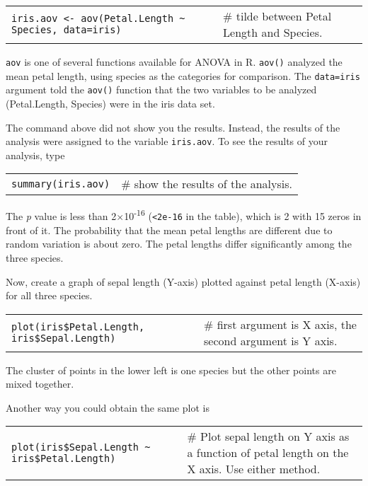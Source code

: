 \documentclass[11pt]{article}
\begin{document}
\begin{tabular}{@{}L{4in}L{1.5in}@{}}
\texttt{iris.aov \textless{}- aov(Petal.Length \textasciitilde{} Species,
data=iris)} &  \# tilde between Petal Length and Species.\\
\end{tabular}

\texttt{aov} is one of several functions available for ANOVA in R. \texttt{aov()} analyzed
the mean petal length, using species as the categories for comparison.
The \texttt{data=iris} argument told the \texttt{aov()} function that the two variables to
be analyzed (Petal.Length, Species) were in the iris data set.

The command above did not show you the results. Instead, the results of
the analysis were assigned to the variable \texttt{iris.aov}. To see the results
of your analysis, type

\begin{tabular}{@{}L{1.5in}L{4in}@{}}
\texttt{summary(iris.aov)} & \# show the results of the analysis. \\
\end{tabular}

The \emph{p} value is less than 2$\times$10\textsuperscript{-16}
(\texttt{\textless{}2e-16} in the table), which is 2 with 15 zeros in front of
it. The probability that the mean petal lengths are different due to
random variation is about zero. The petal lengths differ significantly
among the three species.

Now, create a graph of sepal length (Y-axis) plotted against petal
length (X-axis) for all three species.

\begin{tabular}{@{}L{3.25in}L{2.25in}@{}}
\texttt{plot(iris\$Petal.Length, iris\$Sepal.Length)} & \# first argument is X
axis, the second argument is Y axis.\\
\end{tabular}

The cluster of points in the lower left is one species but the other
points are mixed together.

Another way you could obtain the same plot is

\begin{tabular}{@{}L{3.25in}L{2.25in}@{}}
\texttt{plot(iris\$Sepal.Length \textasciitilde{} iris\$Petal.Length)} & \# Plot
sepal length on Y axis as a function of petal length on the X axis. Use either method.\\
\end{tabular}
\end{document}
